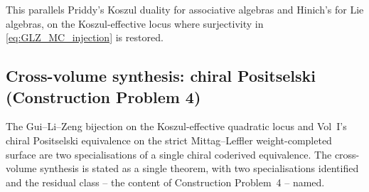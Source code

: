 This parallels Priddy's Koszul duality for associative algebras
and Hinich's for Lie algebras, on the Koszul-effective locus where
surjectivity in \eqref{eq:GLZ_MC_injection} is restored.

\subsection{Cross-volume synthesis: chiral Positselski (Construction Problem 4)}
\label{subsec:chiral-positselski-cross-volume}

The Gui--Li--Zeng bijection on the Koszul-effective quadratic locus
and Vol~I's chiral Positselski equivalence on the strict
Mittag--Leffler weight-completed surface are two specialisations of
a single chiral coderived equivalence. The cross-volume synthesis is
stated as a single theorem, with two specialisations identified and
the residual class -- the content of Construction Problem~4 --
named.

